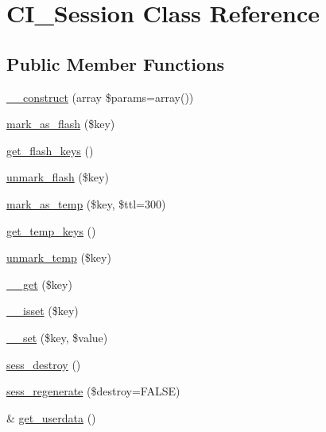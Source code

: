 \hypertarget{class_c_i___session}{}\section{C\+I\+\_\+\+Session Class Reference}
\label{class_c_i___session}
\subsection*{Public Member Functions}
\begin{DoxyCompactItemize}
\item 
\mbox{\hyperlink{class_c_i___session_a25ed097b8862ede401887a389b1f0b37}{\+\_\+\+\_\+construct}} (array \$params=array())
\item 
\mbox{\hyperlink{class_c_i___session_a4c86053a064c562ff5328b531174e9d3}{mark\+\_\+as\+\_\+flash}} (\$key)
\item 
\mbox{\hyperlink{class_c_i___session_a587196896821149b9b55cc73b2406c55}{get\+\_\+flash\+\_\+keys}} ()
\item 
\mbox{\hyperlink{class_c_i___session_af333087c7f191878e19c15fd98f5e301}{unmark\+\_\+flash}} (\$key)
\item 
\mbox{\hyperlink{class_c_i___session_a8b76c8a0fc2a58819b26b0bba723354c}{mark\+\_\+as\+\_\+temp}} (\$key, \$ttl=300)
\item 
\mbox{\hyperlink{class_c_i___session_a0999ab99fdf51f50e3b220d2bc80ca57}{get\+\_\+temp\+\_\+keys}} ()
\item 
\mbox{\hyperlink{class_c_i___session_a3ab507f83d222d336d1878aeef505e2b}{unmark\+\_\+temp}} (\$key)
\item 
\mbox{\hyperlink{class_c_i___session_a9026ff262ce89e9194481fbf2fb47b36}{\+\_\+\+\_\+get}} (\$key)
\item 
\mbox{\hyperlink{class_c_i___session_a657f218c2cf06f8e8f9896e5ebdb3c9e}{\+\_\+\+\_\+isset}} (\$key)
\item 
\mbox{\hyperlink{class_c_i___session_a679db94c08024d509f14d7c0ffef7feb}{\+\_\+\+\_\+set}} (\$key, \$value)
\item 
\mbox{\hyperlink{class_c_i___session_a07d19a964317cc070e684c34619341fe}{sess\+\_\+destroy}} ()
\item 
\mbox{\hyperlink{class_c_i___session_a1ebae0776dc307559338c22e33de9510}{sess\+\_\+regenerate}} (\$destroy=F\+A\+L\+SE)
\item 
\& \mbox{\hyperlink{class_c_i___session_ae570c1ad7563fee82f9c99ab5a22fb0a}{get\+\_\+userdata}} ()
\item 

\end{DoxyCompactItemize}
